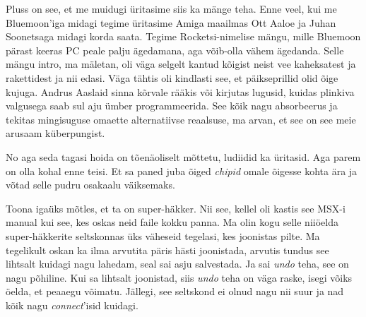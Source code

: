 Pluss on see, et me muidugi üritasime  siis ka mänge teha. Enne veel, kui me 
Bluemoon'iga  midagi tegime üritasime Amiga maailmas  Ott 
Aaloe ja Juhan Soonetsaga 
midagi korda saata. Tegime Rocketsi-nimelise mängu, mille 
Bluemoon pärast keeras PC peale palju ägedamana, aga võib-olla vähem ägedanda. 
Selle mängu intro, ma mäletan, oli väga selgelt kantud kõigist neist vee 
kaheksatest ja rakettidest ja nii edasi. Väga tähtis oli kindlasti see, et 
päikseprillid olid õige kujuga. Andrus Aaslaid 
sinna kõrvale rääkis või kirjutas lugusid, kuidas plinkiva valgusega saab sul 
aju ümber programmeerida. See kõik nagu absorbeerus ja tekitas mingisuguse 
omaette alternatiivse reaalsuse, ma arvan, et see on see meie arusaam 
küberpungist. 


No aga seda tagasi hoida on tõenäoliselt mõttetu, ludiidid ka üritasid. Aga 
parem on olla kohal enne teisi. Et sa paned juba õiged \emph{chipid} omale 
õigesse kohta  ära ja võtad selle pudru osakaalu väiksemaks. 


Toona igaüks mõtles, et ta on super-häkker. Nii see, kellel oli kastis see 
MSX-i manual kui see, kes oskas neid faile kokku panna. Ma olin kogu selle 
niiöelda super-häkkerite seltskonnas üks väheseid tegelasi, kes joonistas 
pilte. Ma  tegelikult oskan ka ilma arvutita päris hästi joonistada, arvutis 
tundus see lihtsalt  kuidagi nagu lahedam, seal sai asju salvestada. Ja sai 
\emph{undo} teha, see on nagu põhiline. Kui sa lihtsalt joonistad, siis 
\emph{undo} teha on väga raske, isegi võiks öelda, et peaaegu võimatu. Jällegi, 
see seltskond ei olnud nagu nii suur ja nad kõik nagu \emph{connect}'isid 
kuidagi. 


